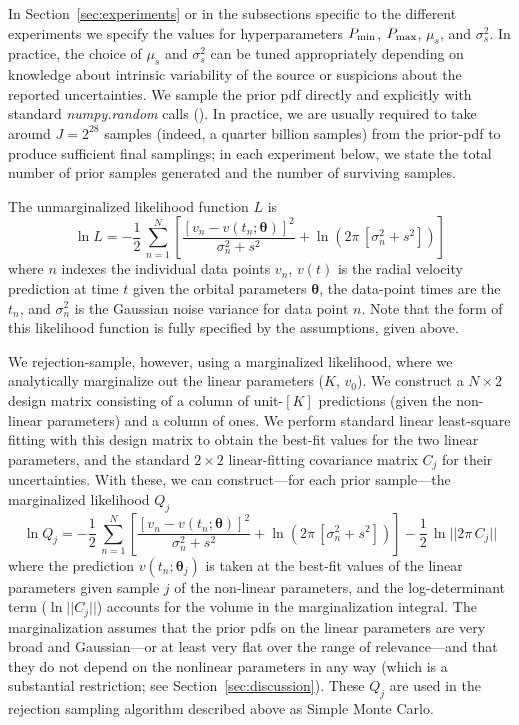 \documentclass[manuscript, letterpaper]{aastex6}
\newcommand{\project}[1]{\textsl{#1}}
\newcommand{\sectionname}{Section}
\newcommand{\bs}[1]{\boldsymbol{#1}}
\begin{document}
In \sectionname~\ref{sec:experiments} or in the subsections specific to the
different experiments we specify the values for hyperparameters $P_{\rm min}$,
$P_{\rm max}$, $\mu_s$, and $\sigma^2_s$.
In practice, the choice of $\mu_s$ and $\sigma^2_s$ can be tuned appropriately
depending on knowledge about intrinsic variability of the source or suspicions
about the reported uncertainties.
We sample the prior pdf directly and explicitly with standard
\project{numpy.random} calls (\citealt{Van-der-Walt:2011}).
In practice, we are usually required to take around $J=2^{28}$ samples (indeed,
a quarter billion samples) from the prior-pdf to produce sufficient final
samplings; in each experiment below, we state  the total number of prior samples
generated and the number of surviving samples.

The unmarginalized likelihood function $L$ is
\begin{equation}
\ln L = -\frac{1}{2}\,\sum_{n=1}^N \left[\frac{[v_n - v(t_n;\bs{\theta})]^2}{\sigma_n^2 + s^2}
 +\ln \left(2\pi\,[\sigma_n^2 + s^2]\right) \right]
\end{equation}
where $n$ indexes the individual data points $v_n$, $v(t)$ is the radial
velocity prediction at time $t$ given the orbital parameters $\bs{\theta}$, the
data-point times are the $t_n$, and $\sigma_n^2$ is the Gaussian noise variance
for data point $n$.
Note that the form of this likelihood function is fully specified by the
assumptions, given above.

We rejection-sample, however, using a marginalized likelihood, where we
analytically marginalize out the linear parameters ($K$, $v_0$).
We construct a $N \times 2$ design matrix consisting of a column of unit-$[K]$
predictions (given the non-linear parameters) and a column of ones.
We perform standard linear least-square fitting with this design
matrix to obtain the best-fit values for the two linear parameters,
and the standard $2\times 2$ linear-fitting covariance matrix $C_j$ for their
uncertainties.
With these, we can construct---for each prior sample---the marginalized
likelihood $Q_j$
\begin{equation}
\ln Q_j = -\frac{1}{2}\,\sum_{n=1}^N \left[\frac{[v_n - v(t_n;\bs{\theta})]^2}{\sigma_n^2 + s^2}
 +\ln \left(2\pi\,[\sigma_n^2 + s^2]\right) \right] -\frac{1}{2}\,\ln ||2\pi\,C_j||
\end{equation}
where the prediction $v(t_n;\bs{\theta}_j)$ is taken at the best-fit values of
the linear parameters given sample $j$ of the non-linear parameters, and the
log-determinant term ($\ln ||C_j||$) accounts for the volume in the
marginalization integral.
The marginalization assumes that the prior pdfs on the linear parameters
are very broad and Gaussian---or
at least very flat over the range of relevance---and that they do not depend
on the nonlinear parameters in any way (which is a substantial restriction;
see \sectionname~\ref{sec:discussion}).
These $Q_j$ are used in the rejection sampling algorithm described above
as Simple Monte Carlo.
\end{document}
